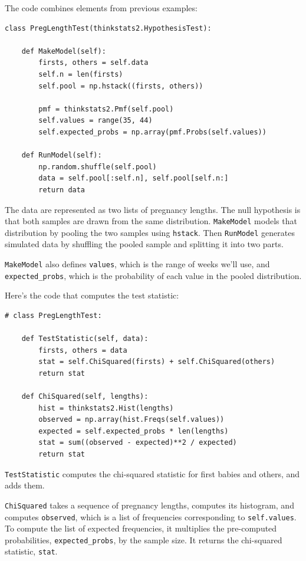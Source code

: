 \documentclass[12pt]{book}
\begin{document}
The code combines elements from previous examples:

\begin{verbatim}
class PregLengthTest(thinkstats2.HypothesisTest):

    def MakeModel(self):
        firsts, others = self.data
        self.n = len(firsts)
        self.pool = np.hstack((firsts, others))

        pmf = thinkstats2.Pmf(self.pool)
        self.values = range(35, 44)
        self.expected_probs = np.array(pmf.Probs(self.values))

    def RunModel(self):
        np.random.shuffle(self.pool)
        data = self.pool[:self.n], self.pool[self.n:]
        return data
\end{verbatim}

The data are represented as two lists of pregnancy lengths.  The null
hypothesis is that both samples are drawn from the same distribution.
{\tt MakeModel} models that distribution by pooling the two
samples using {\tt hstack}.  Then {\tt RunModel} generates
simulated data by shuffling the pooled sample and splitting it
into two parts.

{\tt MakeModel} also defines {\tt values}, which is the
range of weeks we'll use, and \verb"expected_probs",
which is the probability of each value in the pooled distribution.

Here's the code that computes the test statistic:

\begin{verbatim}
# class PregLengthTest:

    def TestStatistic(self, data):
        firsts, others = data
        stat = self.ChiSquared(firsts) + self.ChiSquared(others)
        return stat

    def ChiSquared(self, lengths):
        hist = thinkstats2.Hist(lengths)
        observed = np.array(hist.Freqs(self.values))
        expected = self.expected_probs * len(lengths)
        stat = sum((observed - expected)**2 / expected)
        return stat
\end{verbatim}

{\tt TestStatistic} computes the chi-squared statistic for
first babies and others, and adds them.

{\tt ChiSquared} takes a sequence of pregnancy lengths, computes
its histogram, and computes {\tt observed}, which is a list of
frequencies corresponding to {\tt self.values}.
To compute the list of expected frequencies, it multiplies the
pre-computed probabilities, \verb"expected_probs", by the sample
size.  It returns the chi-squared statistic, {\tt stat}.
\end{document}
